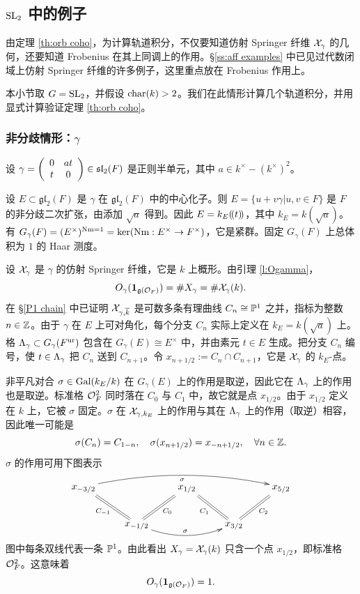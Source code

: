 \subsection{$\textup{SL}_{2}$ 中的例子}
由定理 \ref{th:orb coho}，为计算轨道积分，不仅要知道仿射 Springer 纤维 $\mathcal{X}_{\gamma}$ 的几何，还要知道 Frobenius 在其上同调上的作用。\S\ref{ss:aff examples} 中已见过代数闭域上仿射 Springer 纤维的许多例子，这里重点放在 Frobenius 作用上。

本小节取 $G=\textup{SL}_{2}$，并假设 $\textup{char}(k)>2$。我们在此情形计算几个轨道积分，并用显式计算验证定理 \ref{th:orb coho}。

\subsubsection{非分歧情形：$\gamma$}\label{unram sl2} 设 $\gamma=\left(\begin{array}{cc} 0 & at \\ t & 0 \end{array}\right)\in\mathfrak{sl}_{2}(F)$ 是正则半单元，其中 $a\in k^{\times}-(k^{\times})^{2}$。

设 $E\subset\mathfrak{gl}_{2}(F)$ 是 $\gamma$ 在 $\mathfrak{gl}_{2}(F)$ 中的中心化子。则 $E=\{u+v\gamma|u,v\in F\}$ 是 $F$ 的非分歧二次扩张，由添加 $\sqrt{a}$ 得到。因此 $E=k_{E}(\!(t)\!)$，其中 $k_{E}= k(\sqrt{a})$。有 $G_{\gamma}(F)=(E^{\times})^{\textup{Nm}=1}=\ker(\textup{Nm}: E^{\times}\to F^{\times})$，它是紧群。固定 $G_{\gamma}(F)$ 上总体积为 $1$ 的 Haar 测度。

设 $\mathcal{X}_{\gamma}$ 是 $\gamma$ 的仿射 Springer 纤维，它是 $k$ 上概形。由引理 \ref{l:Ogamma}，
\begin{equation*}
O_{\gamma}(\mathbf{1}_{\mathfrak{g}(\mathcal{O}_{F})})=\#X_{\gamma}=\#\mathcal{X}_{\gamma}(k).
\end{equation*}
在 \S\ref{P1 chain} 中已证明 $\mathcal{X}_{\gamma,\overline{k}}$ 是可数多条有理曲线 $C_{n}\cong\mathbb{P}^{1}$ 之并，指标为整数 $n\in\mathbb{Z}$。由于 $\gamma$ 在 $E$ 上可对角化，每个分支 $C_{n}$ 实际上定义在 $k_{E}=k(\sqrt{a})$ 上。格 $\Lambda_{\gamma}\subset G_{\gamma}(F^{\textup{ur}})$ 包含在 $G_{\gamma}(E)\cong E^{\times}$ 中，并由素元 $t\in E$ 生成。把分支 $C_{n}$ 编号，使 $t\in \Lambda_{\gamma}$ 把 $C_{n}$ 送到 $C_{n+1}$。令 $x_{n+1/2}:=C_{n}\cap C_{n+1}$，它是 $\mathcal{X}_{\gamma}$ 的 $k_{E}$-点。

非平凡对合 $\sigma\in\textup{Gal}(k_{E}/k)$ 在 $G_{\gamma}(E)$ 上的作用是取逆，因此它在 $\Lambda_{\gamma}$ 上的作用也是取逆。标准格 $\mathcal{O}^{2}_{F}$ 同时落在 $C_{0}$ 与 $C_{1}$ 中，故它就是点 $x_{1/2}$。由于 $x_{1/2}$ 定义在 $k$ 上，它被 $\sigma$ 固定。$\sigma$ 在 $\mathcal{X}_{\gamma,k_{E}}$ 上的作用与其在 $\Lambda_{\gamma}$ 上的作用（取逆）相容，因此唯一可能是
\begin{equation*}
\sigma(C_{n})=C_{1-n}, \quad \sigma(x_{n+1/2})=x_{-n+1/2}, \quad\forall n\in\mathbb{Z}.
\end{equation*}
$\sigma$ 的作用可用下图表示
\begin{equation*}
\xymatrix{ x_{-3/2} \ar@/^{1pc}/[rrrr]_{\sigma}
\ar@{=} '[dr]_{C_{-1}} '[rr]_{C_{0}}  '[drrr]_{C_{1}}  [rrrr]_{C_{2}}
&  & x_{1/2}  & & x_{5/2} \\
& x_{-1/2}\ar@/_1pc/[rr]^{\sigma} &  & x_{3/2}}
\end{equation*}
图中每条双线代表一条 $\mathbb{P}^{1}$。由此看出 $X_{\gamma}=\mathcal{X}_{\gamma}(k)$ 只含一个点 $x_{1/2}$，即标准格 $\mathcal{O}^{2}_{F}$。这意味着
\begin{equation}\label{Oga}
O_{\gamma}(\mathbf{1}_{\mathfrak{g}(\mathcal{O}_{F})})=1.
\end{equation}

